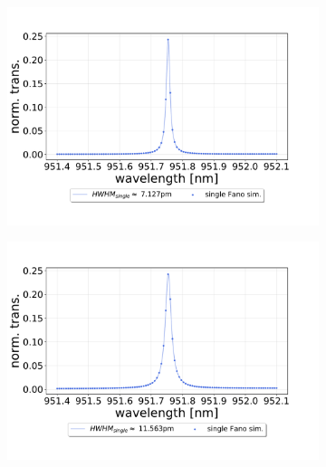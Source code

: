 \begin{figure}[h!]
    \centering
    \begin{subfigure}[b]{0.49\textwidth}
        \includegraphics[width=\textwidth]{figures/results/single fano fits/380um_M5_simfit.pdf}
        \caption{}
        \label{fig:380um_M5_sim}
    \end{subfigure}
    \begin{subfigure}[b]{0.49\textwidth}
        \includegraphics[width=\textwidth]{figures/results/single fano fits/220um_M5_simfit.pdf}
        \caption{}
        \label{fig:220um_M5_sim}
    \end{subfigure}
    \begin{subfigure}[b]{0.49\textwidth}

\end{subfigure}
\end{figure}
